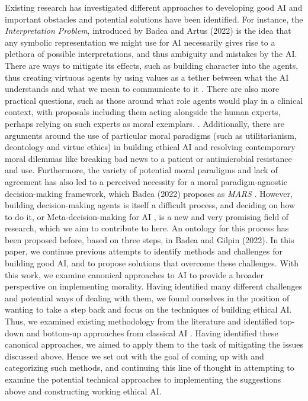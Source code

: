 \documentclass[10pt]{article}
\begin{document}
Existing research has investigated different approaches to developing good AI and important obstacles and potential solutions have been identified. For instance, the \textit{Interpretation Problem}, introduced by Badea and Artus (2022)\textsuperscript{\cite{badea_morality_2022}} is the idea that any symbolic representation we might use for AI necessarily gives rise to a plethora of possible interpretations, and thus ambiguity and mistakes by the AI. There are ways to mitigate its effects, such as building character into the agents, thus creating virtuous agents by using values as a tether between what the AI understands and what we mean to communicate to it \textsuperscript{\cite{badea_morality_2022}}. There are also more practical questions, such as those around what role agents would play in a clinical context, with proposals including them acting alongside the human experts, perhaps relying on such experts as moral exemplars. \textsuperscript{\cite{hindocha_moral_2022}}. Additionally, there are arguments around the use of particular moral paradigms (such as utilitarianism, deontology and virtue ethics) in building ethical AI and resolving contemporary moral dilemmas like breaking bad news to a patient \textsuperscript{\cite{post_breaking_2022}} or antimicrobial resistance and use\textsuperscript{\cite{bolton_developing_2022}}. Furthermore, the variety of potential moral paradigms and lack of agreement has also led to a perceived necessity for a moral paradigm-agnostic decision-making framework, which Badea (2022) proposes as \textit{MARS} \textsuperscript{\cite{badea_have_2022}}. However, building decision-making agents is itself a difficult process, and deciding on how to do it, or Meta-decision-making for AI \textsuperscript{\cite{badea_establishing_2022}}, is a new and very promising field of research, which we aim to contribute to here. An ontology for this process has been proposed before, based on three steps, in Badea and Gilpin (2022).
In this paper, we continue previous attempts to identify methods and challenges for building good AI, and to propose solutions that overcome these challenges. With this work, we examine canonical approaches to AI to provide a broader perspective on implementing morality. Having identified many different challenges and potential ways of dealing with them, we found ourselves in the position of wanting to take a step back and focus on the techniques of building ethical AI. Thus, we examined existing methodology from the literature and identified top-down and bottom-up approaches from classical AI \textsuperscript{\cite{abel_reinforcement_2016}}. Having identified these canonical approaches, we aimed to apply them to the task of mitigating the issues discussed above. Hence we set out with the goal of coming up with and categorizing such methods, and continuing this line of thought in attempting to examine the potential technical approaches to implementing the suggestions above and constructing working ethical AI. 
\end{document}
